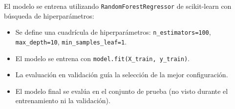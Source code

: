 \documentclass[12pt,a4paper]{article}
\begin{document}
El modelo se entrena utilizando \texttt{RandomForestRegressor} de scikit-learn con búsqueda de hiperparámetros:

\begin{itemize}
    \item Se define una cuadrícula de hiperparámetros: \texttt{n\_estimators=100}, \texttt{max\_depth=10}, \texttt{min\_samples\_leaf=1}.
    \item El modelo se entrena con \texttt{model.fit(X\_train, y\_train)}.
    \item La evaluación en validación guía la selección de la mejor configuración.
    \item El modelo final se evalúa en el conjunto de prueba (no visto durante el entrenamiento ni la validación).
\end{itemize}

\newpage



\end{document}
